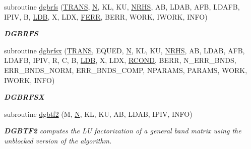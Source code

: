 \begin{DoxyCompactItemize}
subroutine \hyperlink{group__doubleGBcomputational_gaca8c0cab9523d894fb4cdbe4dffa26d8}{dgbrfs} (\hyperlink{superlu__enum__consts_8h_a0c4e17b2d5cea33f9991ccc6a6678d62a1f61e3015bfe0f0c2c3fda4c5a0cdf58}{T\+R\+A\+N\+S}, \hyperlink{polmisc_8c_a0240ac851181b84ac374872dc5434ee4}{N}, K\+L, K\+U, \hyperlink{example__user_8c_aa0138da002ce2a90360df2f521eb3198}{N\+R\+H\+S}, A\+B, L\+D\+A\+B, A\+F\+B, L\+D\+A\+F\+B, I\+P\+I\+V, B, \hyperlink{example__user_8c_a50e90a7104df172b5a89a06c47fcca04}{L\+D\+B}, X, L\+D\+X, \hyperlink{superlu__enum__consts_8h_af00a42ecad444bbda75cde1b64bd7e72a78fd14d7abebae04095cfbe02928f153}{F\+E\+R\+R}, B\+E\+R\+R, W\+O\+R\+K, I\+W\+O\+R\+K, I\+N\+F\+O)
\begin{DoxyCompactList}\small\item\em {\bfseries D\+G\+B\+R\+F\+S} \end{DoxyCompactList}\item 
subroutine \hyperlink{group__doubleGBcomputational_gab44677451338eb1a966f510ca0a38d1c}{dgbrfsx} (\hyperlink{superlu__enum__consts_8h_a0c4e17b2d5cea33f9991ccc6a6678d62a1f61e3015bfe0f0c2c3fda4c5a0cdf58}{T\+R\+A\+N\+S}, E\+Q\+U\+E\+D, \hyperlink{polmisc_8c_a0240ac851181b84ac374872dc5434ee4}{N}, K\+L, K\+U, \hyperlink{example__user_8c_aa0138da002ce2a90360df2f521eb3198}{N\+R\+H\+S}, A\+B, L\+D\+A\+B, A\+F\+B, L\+D\+A\+F\+B, I\+P\+I\+V, R, C, B, \hyperlink{example__user_8c_a50e90a7104df172b5a89a06c47fcca04}{L\+D\+B}, X, L\+D\+X, \hyperlink{superlu__enum__consts_8h_af00a42ecad444bbda75cde1b64bd7e72a9b5c151728d8512307565994c89919d5}{R\+C\+O\+N\+D}, B\+E\+R\+R, N\+\_\+\+E\+R\+R\+\_\+\+B\+N\+D\+S, E\+R\+R\+\_\+\+B\+N\+D\+S\+\_\+\+N\+O\+R\+M, E\+R\+R\+\_\+\+B\+N\+D\+S\+\_\+\+C\+O\+M\+P, N\+P\+A\+R\+A\+M\+S, P\+A\+R\+A\+M\+S, W\+O\+R\+K, I\+W\+O\+R\+K, I\+N\+F\+O)
\begin{DoxyCompactList}\small\item\em {\bfseries D\+G\+B\+R\+F\+S\+X} \end{DoxyCompactList}\item 
subroutine \hyperlink{group__doubleGBcomputational_gad1efab86e6d869915e059286ecf1bcb1}{dgbtf2} (M, \hyperlink{polmisc_8c_a0240ac851181b84ac374872dc5434ee4}{N}, K\+L, K\+U, A\+B, L\+D\+A\+B, I\+P\+I\+V, I\+N\+F\+O)
\begin{DoxyCompactList}\small\item\em {\bfseries D\+G\+B\+T\+F2} computes the L\+U factorization of a general band matrix using the unblocked version of the algorithm. \end{DoxyCompactList}\item 

\end{DoxyCompactItemize}
